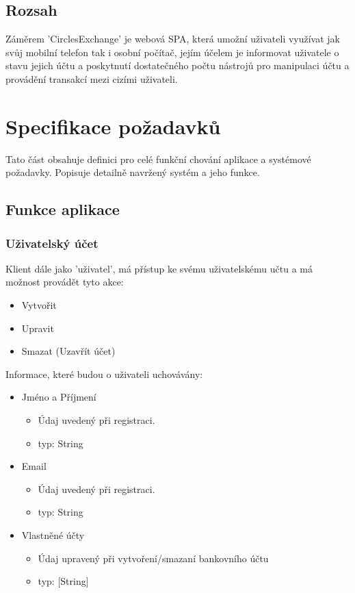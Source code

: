 \documentclass[FM,SP]{tulthesis}
\newcommand{\appName}{CirclesExchange}
\newcommand{\appNameQ}{'\appName'}
\begin{document}
\section{Rozsah}
Záměrem \appNameQ{} je webová SPA, která umožní uživateli využívat jak svůj mobilní telefon tak i osobní počítač, jejím účelem je informovat uživatele o stavu jejich účtu a poskytnutí dostatečného počtu nástrojů pro manipulaci účtu a provádění transakcí mezi cizími uživateli.

\chapter{Specifikace požadavků}

Tato část obsahuje definici pro celé funkční chování aplikace a systémové požadavky. Popisuje detailně navržený systém a jeho funkce.

\section{Funkce aplikace}

\subsection{Uživatelský účet}

Klient dále jako 'uživatel', má přístup ke svému uživatelskému učtu a má možnost provádět tyto akce:
\begin{itemize}
    \item Vytvořit
    \item Upravit
    \item Smazat  (Uzavřít účet)
\end{itemize}
Informace, které budou o uživateli uchovávány:
\begin{itemize}
    \item Jméno a Příjmení
          \begin{itemize}
              \item Údaj uvedený při registraci.
              \item typ: String
          \end{itemize}
    \item Email
          \begin{itemize}
              \item Údaj uvedený při registraci.
              \item typ: String
          \end{itemize}
    \item Vlastněné účty
          \begin{itemize}
              \item Údaj upravený při vytvoření/smazaní bankovního účtu
              \item typ: [String]
          \end{itemize}
\end{itemize}
\end{document}
